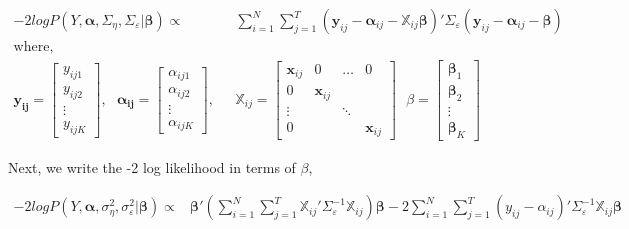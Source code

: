 \documentclass[
]{article}
\begin{document}
\begin{equation*}
\begin{aligned}
-2logP(Y, \boldsymbol{\alpha}, \Sigma_\eta, \Sigma_\varepsilon|\boldsymbol{\beta}) \propto & \sum^N_{i=1}\sum^T_{j=1} (\boldsymbol{y}_{ij} - \boldsymbol{\alpha}_{ij} - \boldsymbol{ \mathbb{X}}_{ij}\boldsymbol{\beta})' \Sigma_\varepsilon(\boldsymbol{y}_{ij} - \boldsymbol{\alpha}_{ij} - \boldsymbol{\beta})\\
\text{where,}\\
\boldsymbol{y_{ij}} = \begin{bmatrix}y_{ij1}\\y_{ij2}\\ \vdots \\ y_{ijK}\end{bmatrix}, \ \ \
\boldsymbol{\alpha_{ij}} = \begin{bmatrix}\alpha_{ij1}\\\alpha_{ij2}\\ \vdots \\ \alpha_{ijK}\end{bmatrix}, \ \ \ &
\boldsymbol{ \mathbb{X}}_{ij} = \begin{bmatrix}\boldsymbol{x}_{ij} & 0 & \dots & 0 \\ 0 & \boldsymbol{x}_{ij} \\ \vdots & & \ddots \\
0 & & & \boldsymbol{x}_{ij}\end{bmatrix} \ \ \
\beta = \begin{bmatrix}\boldsymbol{\beta}_1\\ \boldsymbol{\beta}_2 \\ \vdots \\ \boldsymbol{\beta}_K\end{bmatrix}
\end{aligned}
\end{equation*}

Next, we write the -2 log likelihood in terms of \(\beta\),

\begin{equation*}
\begin{aligned}
-2logP(Y, \boldsymbol{\alpha}, \sigma^2_\eta, \sigma^2_\varepsilon|\boldsymbol{\beta}) 
\propto & \boldsymbol{\beta}'(\sum^N_{i=1}\sum^T_{j=1}\boldsymbol{ \mathbb{X}}_{ij}'\Sigma_\varepsilon^{-1}\boldsymbol{ \mathbb{X}}_{ij})\boldsymbol{\beta} -2\sum^N_{i=1}\sum^T_{j=1}(y_{ij} - \alpha_{ij})'\Sigma_\varepsilon^{-1}\boldsymbol{ \mathbb{X}}_{ij}\boldsymbol{\beta} 
\end{aligned}
\end{equation*}
\end{document}
